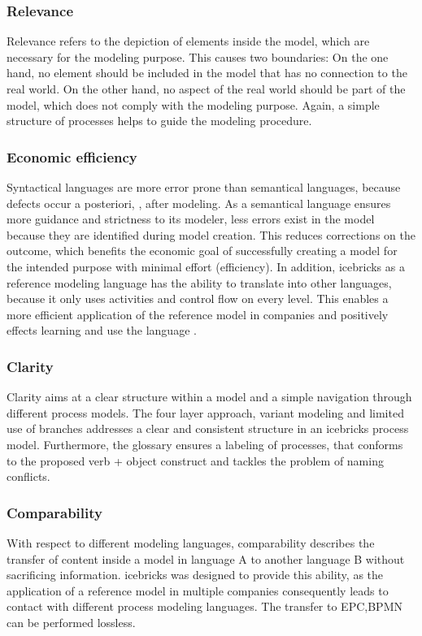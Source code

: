 	 \subsubsection{Relevance}
	 Relevance refers to the depiction of elements inside the model, which are necessary for the modeling purpose. This causes two boundaries: On the one hand, no element should be included in the model that has no connection to the real world. On the other hand, no aspect of the real world should be part of the model, which does not comply with the modeling purpose. Again, a simple structure of processes helps to guide the modeling procedure. 
	 
	  \subsubsection{Economic efficiency}
	 Syntactical languages are more error prone than semantical languages, because defects occur a posteriori, \ie, after modeling. As a semantical language ensures more guidance and strictness to its modeler, less errors exist in the model because they are identified during model creation. This reduces corrections on the outcome, which benefits the economic goal of successfully creating a model for the intended purpose with minimal effort (efficiency). In addition, icebricks as a reference modeling language has the ability to translate into other languages, because it only uses activities and control flow on every level. This enables a more efficient application of the reference model in companies and positively effects learning and use the language \citep{Muehlen}. 
	 
	 \subsubsection{Clarity}
	 Clarity aims at a clear structure within a model and a simple navigation through different process models. The four layer approach, variant modeling and limited use of branches addresses a clear and consistent structure in an icebricks process model. Furthermore, the glossary ensures a labeling of processes, that conforms to the proposed verb + object construct \citep{7pmg} and tackles the problem of naming conflicts.
	 
	 \subsubsection{Comparability} 
	 With respect to different modeling languages, comparability describes the transfer of content inside a model in language A to another language B without sacrificing information. icebricks was designed to provide this ability, as the application of a reference model in multiple companies consequently leads to contact with different process modeling languages. The transfer to \acrshort{EPC},\acrshort{BPMN} can be performed lossless.
	 
